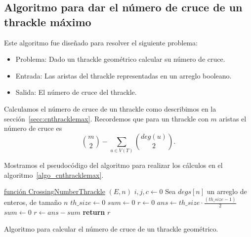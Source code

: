 \subsection{Algoritmo para dar el número de cruce de un thrackle máximo}
  \label{secc:algo_cnthracklemax}

  Este algoritmo fue diseñado para resolver el siguiente problema:
  \begin{itemize}
    \item[] Problema: Dado un thrackle geométrico calcular su número de cruce.
    \item[] Entrada: Las aristas del thrackle representadas en un arreglo booleano.
    \item[] Salida: El número de cruce del thrackle.
  \end{itemize}

  Calculamos el número de cruce de un thrackle como describimos en la
  sección~\ref{secc:cnthracklemax}. Recordemos que para un thrackle con $m$ aristas el número de cruce
  es \[ \binom{m}{2} - \sum_{u\in V(T)} \binom{deg(u)}{2}. \]

  Mostramos el pseudocódigo del algoritmo para realizar los cálculos en el algoritmo~\ref{algo_cnthracklemax}.

  \begin{algorithm}[b]
    \DontPrintSemicolon
    \underline{función CrossingNumberThrackle} $(E,n)$\;
     $i,j,c \gets 0$\;
     Sea $degs[n]$ un arreglo de enteros, de tamaño $n$\;
     $th\_size \gets 0$\;
     $sum \gets 0$\;
     $r \gets 0$\;
     $ans \gets th\_size\cdot \frac{(th\_size-1)}{2}$\;
     $sum \gets 0$\;
     $r \gets ans-sum$\;
     \textbf{return} $r$\;
    \caption{Algoritmo para calcular el número de cruce de un thrackle geométrico.}
    \label{algo_cnthracklemax}
  \end{algorithm}

